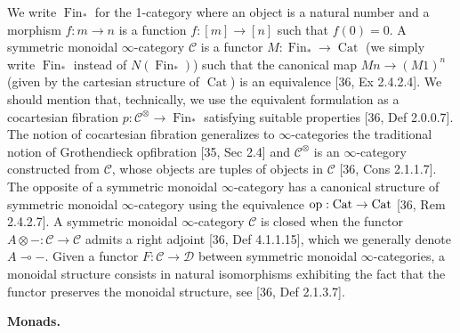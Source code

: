 \documentclass[10pt,a4paper]{article}
\begin{document}
We write $\operatorname{Fin}_{\ast}$ for the 1-category where an object is a natural number and a morphism $f:m\to n$ is a function $f:[m]\to[n]$ such that $f(0)=0$. A symmetric monoidal $\infty$-category $\mathcal{C}$ is a functor $M:\operatorname{Fin}_{\ast}\to\operatorname{Cat}$ (we simply write $\operatorname{Fin}_{\ast}$ instead of $N(\operatorname{Fin}_{\ast})$) such that the canonical map $Mn\to(M1)^{n}$ (given by the cartesian structure of $\operatorname{Cat}$) is an equivalence [36, Ex 2.4.2.4]. We should mention that, technically, we use the equivalent formulation as a cocartesian fibration $p:\mathcal{C}^{\otimes}\to\operatorname{Fin}_{\ast}$ satisfying suitable properties [36, Def 2.0.0.7]. The notion of cocartesian fibration generalizes to $\infty$-categories the traditional notion of Grothendieck opfibration [35, Sec 2.4] and $\mathcal{C}^{\otimes}$ is an $\infty$-category constructed from $\mathcal{C}$, whose objects are tuples of objects in $\mathcal{C}$ [36, Cons 2.1.1.7]. The opposite of a symmetric monoidal $\infty$-category has a canonical structure of symmetric monoidal $\infty$-category using the equivalence $\textnormal{op}:\operatorname{Cat}\to\operatorname{Cat}$ [36, Rem 2.4.2.7]. A symmetric monoidal $\infty$-category $\mathcal{C}$ is closed when the functor $A\otimes-:\mathcal{C}\to\mathcal{C}$ admits a right adjoint [36, Def 4.1.1.15], which we generally denote $A\multimap-$. Given a functor $F:\mathcal{C}\to\mathcal{D}$ between symmetric monoidal $\infty$-categories, a monoidal structure consists in natural isomorphisms exhibiting the fact that the functor preserves the monoidal structure, see [36, Def 2.1.3.7].\par
 
 
 
 
\par\medskip\noindent\textbf{Monads.}\par
 
 
\end{document}
